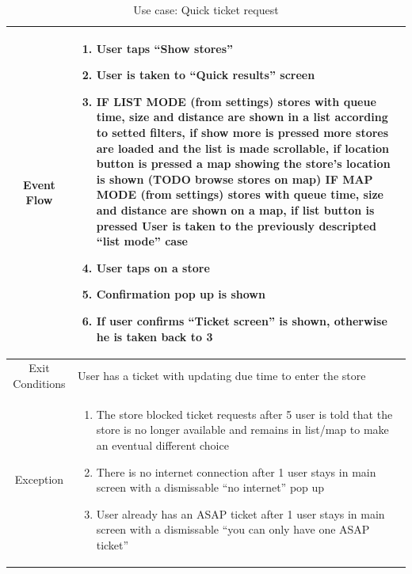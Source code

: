 \begin{enumerate}
\begin{table}[H]
{\begin{tabular}{|c|p{14cm}|}
		Event Flow & \begin{enumerate}
			\item User taps “Show stores”
			\item User is taken to “Quick results” screen
			\item IF LIST MODE (from settings)\newline
			stores with queue time, size and distance are shown in a list according to setted filters, if show more is pressed more stores are loaded and the list is made scrollable, if location button is pressed a map showing the store’s location is shown (TODO browse stores on map)\newline
			IF MAP MODE (from settings\newline)
			stores with queue time, size and distance are shown on a map, if list button is pressed User is taken to the previously descripted “list mode” case
			\item User taps on a store
			\item Confirmation pop up is shown
			\item If user confirms “Ticket screen” is shown, otherwise he is taken back to 3
		\end{enumerate}\\
	
		\hline
		Exit Conditions & User has a ticket with updating due time to enter the store\\
		\hline
		
		Exception & \begin{enumerate}
			\item The store blocked ticket requests\newline
			after 5 user is told that the store is no longer available and remains in list/map to make an eventual different choice
			
			\item There is no internet connection\newline
			after 1 user stays in main screen with a dismissable “no internet” pop up
			
			\item User already has an ASAP ticket\newline
			after 1 user stays in main screen with a dismissable “you can only have one ASAP ticket” 
			
		\end{enumerate}\\
		
		\hline
	\end{tabular}
}
	\label{tab:UCQuick}
	\caption{Use case: Quick ticket request}
\end{table}


\end{enumerate}
